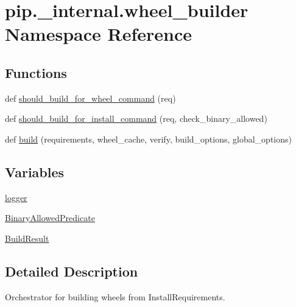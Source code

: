 \hypertarget{namespacepip_1_1__internal_1_1wheel__builder}{}\section{pip.\+\_\+internal.\+wheel\+\_\+builder Namespace Reference}
\label{namespacepip_1_1__internal_1_1wheel__builder}
\subsection*{Functions}
\begin{DoxyCompactItemize}
\item 
def \hyperlink{namespacepip_1_1__internal_1_1wheel__builder_a749449fdb347d3f2ede8c2e5a44ba6de}{should\+\_\+build\+\_\+for\+\_\+wheel\+\_\+command} (req)
\item 
def \hyperlink{namespacepip_1_1__internal_1_1wheel__builder_ab94686847ec6405ad386cc08d1c330f5}{should\+\_\+build\+\_\+for\+\_\+install\+\_\+command} (req, check\+\_\+binary\+\_\+allowed)
\item 
def \hyperlink{namespacepip_1_1__internal_1_1wheel__builder_a413cbabbf4b550b880022d07be8a3df7}{build} (requirements, wheel\+\_\+cache, verify, build\+\_\+options, global\+\_\+options)
\end{DoxyCompactItemize}
\subsection*{Variables}
\begin{DoxyCompactItemize}
\item 
\hyperlink{namespacepip_1_1__internal_1_1wheel__builder_a84898e3516b9c46fa75845a249fc5200}{logger}
\item 
\hyperlink{namespacepip_1_1__internal_1_1wheel__builder_adee63dbab347e19a170a3a7a4a1f7834}{Binary\+Allowed\+Predicate}
\item 
\hyperlink{namespacepip_1_1__internal_1_1wheel__builder_ad8206fa8e5856a00e6283c148f53bfa6}{Build\+Result}
\end{DoxyCompactItemize}


\subsection{Detailed Description}
\begin{DoxyVerb}Orchestrator for building wheels from InstallRequirements.
\end{DoxyVerb}
 

